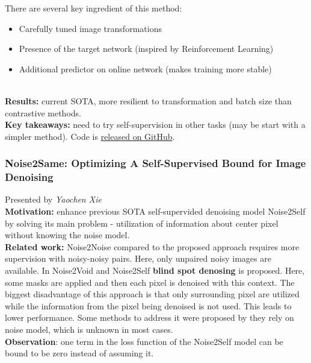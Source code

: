 There are several key ingredient of this method:
\begin{itemize}
    \item Carefully tuned image transformations
    \item Presence of the target network (inspired by Reinforcement Learning)
    \item Additional predictor on online network (makes training more stable)
\end{itemize} \\

{\bf Results:} current SOTA, more resilient to transformation and batch size than contrastive methods. \\

{\bf Key takeaways:} need to try self-supervision in other tasks (may be start with a simpler method). Code is \href{https://github.com/lucidrains/byol-pytorch}{released on GitHub}. \\



\subsubsection{Noise2Same: Optimizing A Self-Supervised Bound for Image Denoising \cite{XieWJ20}}

Presented by \textit{Yaochen Xie}  \\

{\bf Motivation:} enhance previous SOTA self-supervided denoising model Noise2Self \cite{BatsonR19} by solving its main problem - utilization of information about center pixel without knowing the noise model. \\

{\bf Related work:} Noise2Noise \cite{LehtinenMHLKAA18} compared to the proposed approach requires more supervision with noisy-noisy pairs. Here, only unpaired noisy images are available. In Noise2Void \cite{KrullBJ19} and Noise2Self \cite{BatsonR19} \textbf{blind spot denosing} is proposed. Here, some masks are applied and then each pixel is denoised with this context. The biggest disadvantage of this approach is that only surrounding pixel are utilized while the information from the pixel being denoised is not used. This leads to lower performance. Some methods to address it were proposed by they rely on noise model, which is unknown in most cases. \\

{\bf Observation}: one term in the loss function of the Noise2Self model can be bound to be zero instead of assuming it. \\

